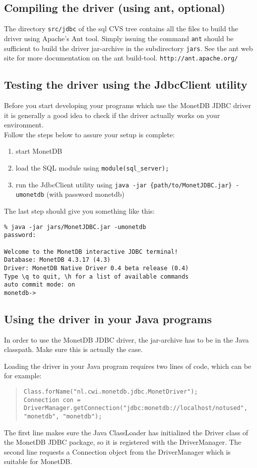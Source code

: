 \documentclass{article}
\begin{document}
\subsection{Compiling the driver (using ant, optional)}
The directory \texttt{src/jdbc} of the sql CVS tree contains all the files to build the driver using
Apache's Ant tool. Simply issuing the command \texttt{ant} should be sufficient to build the driver
jar-archive in the subdirectory \texttt{jars}. See the ant web site for more documentation on the
ant build-tool. \texttt{http://ant.apache.org/}

\subsection{Testing the driver using the JdbcClient utility}
Before you start developing your programs which use the MonetDB JDBC driver it is generally
a good idea to check if the driver actually works on your environment.\\
Follow the steps below to assure your setup is complete:
\begin{enumerate}
\item start MonetDB
\item load the SQL module using \texttt{module(sql\_server);}
\item run the JdbcClient utility using \texttt{java -jar \{path/to/MonetJDBC.jar\} -umonetdb} (with
 password monetdb)
\end{enumerate}
The last step should give you something like this:
\begin{verbatim}
% java -jar jars/MonetJDBC.jar -umonetdb
password:

Welcome to the MonetDB interactive JDBC terminal!
Database: MonetDB 4.3.17 (4.3)
Driver: MonetDB Native Driver 0.4 beta release (0.4)
Type \q to quit, \h for a list of available commands
auto commit mode: on
monetdb->
\end{verbatim}

\subsection{Using the driver in your Java programs}
In order to use the MonetDB JDBC driver, the jar-archive has to be in the Java classpath.
Make sure this is actually the case.

Loading the driver in your Java program requires two lines of code, which can be for example:
\begin{quote}
\texttt{Class.forName("nl.cwi.monetdb.jdbc.MonetDriver");\\
Connection con = DriverManager.getConnection("jdbc:monetdb://localhost/notused", "monetdb", "monetdb");}
\end{quote}
The first line makes sure the Java ClassLoader has initialized the Driver class of the MonetDB
JDBC package, so it is registered with the DriverManager. The second line requests a Connection
object from the DriverManager which is suitable for MonetDB.
\end{document}
